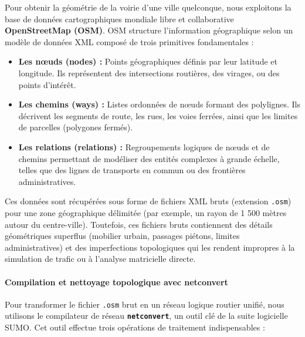 \documentclass[10pt, a4paper]{article}
\providecommand{\tightlist}{}
\begin{document}
Pour obtenir la géométrie de la voirie d'une ville quelconque, nous
exploitons la base de données cartographiques mondiale libre et
collaborative \textbf{OpenStreetMap (OSM)}. OSM structure l'information
géographique selon un modèle de données XML composé de trois primitives
fondamentales :

\begin{itemize}
\tightlist
\item
  \textbf{Les nœuds (nodes) :} Points géographiques définis par leur
  latitude et longitude. Ils représentent des intersections routières,
  des virages, ou des points d'intérêt.
\item
  \textbf{Les chemins (ways) :} Listes ordonnées de nœuds formant des
  polylignes. Ils décrivent les segments de route, les rues, les voies
  ferrées, ainsi que les limites de parcelles (polygones fermés).
\item
  \textbf{Les relations (relations) :} Regroupements logiques de nœuds
  et de chemins permettant de modéliser des entités complexes à grande
  échelle, telles que des lignes de transports en commun ou des
  frontières administratives.
\end{itemize}

Ces données sont récupérées sous forme de fichiers XML bruts (extension
\texttt{.osm}) pour une zone géographique délimitée (par exemple, un
rayon de 1 500 mètres autour du centre-ville). Toutefois, ces fichiers
bruts contiennent des détails géométriques superflus (mobilier urbain,
passages piétons, limites administratives) et des imperfections
topologiques qui les rendent impropres à la simulation de trafic ou à
l'analyse matricielle directe.

\paragraph{Compilation et nettoyage topologique avec
netconvert}\label{compilation-et-nettoyage-topologique-avec-netconvert}

Pour transformer le fichier \texttt{.osm} brut en un réseau logique
routier unifié, nous utilisons le compilateur de réseau
\textbf{\texttt{netconvert}}, un outil clé de la suite logicielle SUMO.
Cet outil effectue trois opérations de traitement indispensables :
\end{document}
